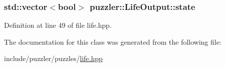 \subsubsection[{state}]{\setlength{\rightskip}{0pt plus 5cm}std\+::vector$<$bool$>$ puzzler\+::\+Life\+Output\+::state}\label{a00011_a305502dbf2764a90c34f3fa64c708d52}


Definition at line 49 of file life.\+hpp.



The documentation for this class was generated from the following file\+:\begin{DoxyCompactItemize}
\item 
include/puzzler/puzzles/\hyperlink{a00130}{life.\+hpp}\end{DoxyCompactItemize}
